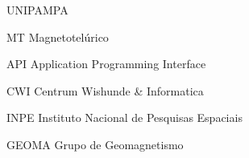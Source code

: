 \documentclass[csgeo,tcc]{unipampa}
\begin{document}









\listoffigures
\listoftables














\begin{listofabbrv}{UNIPAMPA}
        
        \item[MT]           {Magnetotelúrico}        
        \item[API]          {Application Programming Interface}
        \item[CWI]          {Centrum Wishunde \& Informatica}
        \item[INPE]         {Instituto Nacional de Pesquisas Espaciais}
        \item[GEOMA]        {Grupo de Geomagnetismo}
      
\end{listofabbrv}
\end{document}
